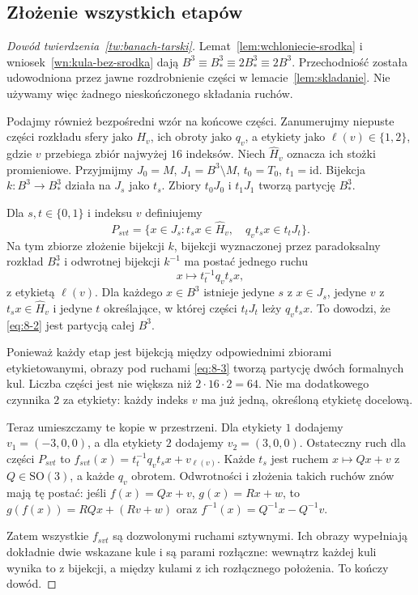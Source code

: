 \documentclass[11pt,a4paper]{article}
\numberwithin{equation}{section}
\theoremstyle{plain}
\theoremstyle{definition}
\theoremstyle{remark}
\newcommand{\id}{\mathrm{id}}
\begin{document}
\subsection{Złożenie wszystkich etapów}
\begin{proof}[Dowód twierdzenia~\ref{tw:banach-tarski}]
Lemat~\ref{lem:wchloniecie-srodka} i wniosek~\ref{wn:kula-bez-srodka} dają $B^3\equiv B^3_*\equiv2B^3_*\equiv2B^3$. Przechodniość została udowodniona przez jawne rozdrobnienie części w lemacie~\ref{lem:skladanie}. Nie używamy więc żadnego nieskończonego składania ruchów.

Podajmy również bezpośredni wzór na końcowe części. Zanumerujmy niepuste części rozkładu sfery jako $H_v$, ich obroty jako $q_v$, a etykiety jako $\ell(v)\in\{1,2\}$, gdzie $v$ przebiega zbiór najwyżej $16$ indeksów. Niech $\widehat H_v$ oznacza ich stożki promieniowe. Przyjmijmy $J_0=M$, $J_1=B^3\setminus M$, $t_0=T_0$, $t_1=\id$. Bijekcja $k:B^3\to B^3_*$ działa na $J_s$ jako $t_s$. Zbiory $t_0J_0$ i $t_1J_1$ tworzą partycję $B^3_*$.

Dla $s,t\in\{0,1\}$ i indeksu $v$ definiujemy
\begin{equation}\label{eq:8-2}
 P_{svt}=\{x\in J_s:t_sx\in\widehat H_v,\quad q_vt_sx\in t_tJ_t\}.
\end{equation}
Na tym zbiorze złożenie bijekcji $k$, bijekcji wyznaczonej przez paradoksalny rozkład $B^3_*$ i odwrotnej bijekcji $k^{-1}$ ma postać jednego ruchu
\begin{equation}\label{eq:8-3}
 x\longmapsto t_t^{-1}q_vt_sx,
\end{equation}
z etykietą $\ell(v)$. Dla każdego $x\in B^3$ istnieje jedyne $s$ z $x\in J_s$, jedyne $v$ z $t_sx\in\widehat H_v$ i jedyne $t$ określające, w której części $t_tJ_t$ leży $q_vt_sx$. To dowodzi, że \eqref{eq:8-2} jest partycją całej $B^3$.

Ponieważ każdy etap jest bijekcją między odpowiednimi zbiorami etykietowanymi, obrazy pod ruchami \eqref{eq:8-3} tworzą partycję dwóch formalnych kul. Liczba części jest nie większa niż $2\cdot16\cdot2=64$. Nie ma dodatkowego czynnika $2$ za etykiety: każdy indeks $v$ ma już jedną, określoną etykietę docelową.

Teraz umieszczamy te kopie w przestrzeni. Dla etykiety $1$ dodajemy $v_1=(-3,0,0)$, a dla etykiety $2$ dodajemy $v_2=(3,0,0)$. Ostateczny ruch dla części $P_{svt}$ to $f_{svt}(x)=t_t^{-1}q_vt_sx+v_{\ell(v)}$. Każde $t_s$ jest ruchem $x\mapsto Qx+v$ z $Q\in\mathrm{SO}(3)$, a każde $q_v$ obrotem. Odwrotności i złożenia takich ruchów znów mają tę postać: jeśli $f(x)=Qx+v$, $g(x)=Rx+w$, to $g(f(x))=RQx+(Rv+w)$ oraz $f^{-1}(x)=Q^{-1}x-Q^{-1}v$.

Zatem wszystkie $f_{svt}$ są dozwolonymi ruchami sztywnymi. Ich obrazy wypełniają dokładnie dwie wskazane kule i są parami rozłączne: wewnątrz każdej kuli wynika to z bijekcji, a między kulami z ich rozłącznego położenia. To kończy dowód.
\end{proof}
\end{document}
